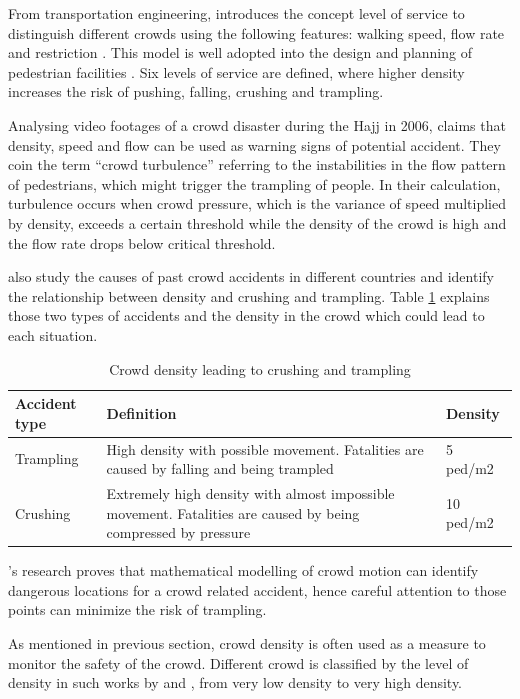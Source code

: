 From transportation engineering, \citet{Fruin1970} introduces the concept level of service to distinguish different crowds using the following features: walking speed, flow rate and restriction \citep{Challenger2009}. This model is well adopted into the design and planning of pedestrian facilities \citep{Shiwakoti2008,Ye2008}. Six levels of service are defined, where higher density increases the risk of pushing, falling, crushing and trampling.

Analysing video footages of a crowd disaster during the Hajj in 2006, \citet{Helbing2007} claims that density, speed and flow can be used as warning signs of potential accident. They coin the term ``crowd turbulence'' referring to the instabilities in the flow pattern of pedestrians, which might trigger the trampling of people. In their calculation, turbulence occurs when crowd pressure, which is the variance of speed multiplied by density, exceeds a certain threshold while the density of the crowd is high and the flow rate drops below critical threshold.

\citet{Lee2005} also study the causes of past crowd accidents in different countries and identify the relationship between density and crushing and trampling. Table \ref{table:densityCrushingTrampling} explains those two types of accidents and the density in the crowd which could lead to each situation.

\begin{table}
	\caption{Crowd density leading to crushing and trampling}
	\label{table:densityCrushingTrampling}
	\centering
	\begin{tabular}{|l|p{9.5cm}|l|}
		\hline
		\textbf{Accident type} & \textbf{Definition} & \textbf{Density} \\ \hline \hline
		Trampling & High density with possible movement. Fatalities are caused by falling and being trampled & 5 ped/m2 \\ \hline
		Crushing & Extremely high density with almost impossible movement. Fatalities are caused by being compressed by pressure & 10 ped/m2 \\ \hline
	\end{tabular}
\end{table}

\citet{Lee2005}’s research proves that mathematical modelling of crowd motion can identify dangerous locations for a crowd related accident, hence careful attention to those points can minimize the risk of trampling.

As mentioned in previous section, crowd density is often used as a measure to monitor the safety of the crowd. Different crowd is classified by the level of density in such works by \citet{Marana1997} and \citet{Weppner2013}, from very low density to very high density.

